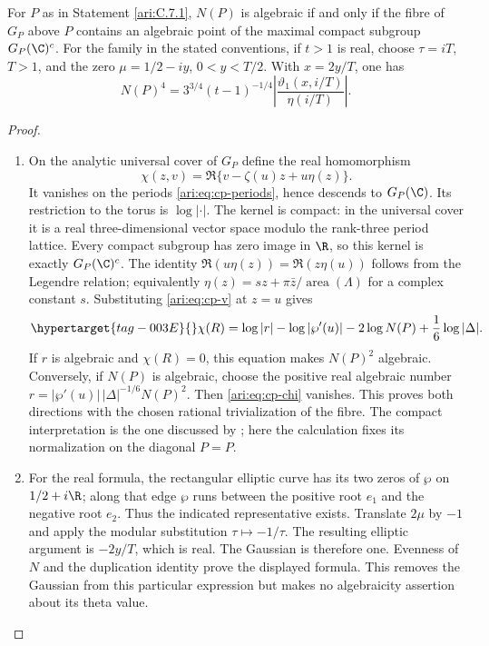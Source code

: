 \begin{proposition}\hypertarget{tag-001B}{}\label{ari:C.7.2}

For $P$ as in Statement \ref{ari:C.7.1}, $N(P)$ is algebraic if and only
if the fibre of $G_P$ above $P$ contains an algebraic point of
the maximal compact subgroup $G_P(\C)^c$.
For the family in the stated conventions, if $t>1$ is real, choose
$\tau=iT$, $T>1$, and the zero $\mu=1/2-iy$, $0<y<T/2$.
With $x=2y/T$, one has
\[
 N(P)^4=3^{3/4}(t-1)^{-1/4}
       \left|\frac{\vartheta_1(x,i/T)}{\eta(i/T)}\right|.
\]
\end{proposition}


\begin{proof}
\begin{enumerate}[label=\arabic*.,leftmargin=*]
\item On the analytic universal cover of $G_P$ define the real
homomorphism
\[
 \chi(z,v)=\Re\{v-\zeta(u)z+u\eta(z)\}.
\]
It vanishes on the periods \eqref{ari:eq:cp-periods}, hence descends
to $G_P(\C)$. Its restriction to the torus is $\log|\cdot|$.
The kernel is compact: in the universal cover it is a real
three-dimensional vector space modulo the rank-three period
lattice. Every compact subgroup has zero image in $\R$, so
this kernel is exactly $G_P(\C)^c$.
The identity
$\Re(u\eta(z))=\Re(z\eta(u))$ follows from the Legendre relation;
equivalently $\eta(z)=sz+\pi\bar z/\operatorname{area}(\Lambda)$
for a complex constant $s$. Substituting
\eqref{ari:eq:cp-v} at $z=u$ gives
\begin{equation}\hypertarget{tag-003E}{}\label{ari:eq:cp-chi}
 \chi(R)=\log|r|-\log|\wp'(u)|
            -2\log N(P)+\frac16\log|\Delta|.
\end{equation}
If $r$ is algebraic and $\chi(R)=0$, this equation makes
$N(P)^2$ algebraic. Conversely, if $N(P)$ is algebraic,
choose the positive real algebraic number
$r=|\wp'(u)|\,|\Delta|^{-1/6}N(P)^2$.
Then \eqref{ari:eq:cp-chi} vanishes. This proves both directions
with the chosen rational trivialization of the fibre.
The compact interpretation is the one discussed by
\citet[slides 5--8]{bertrand2017}; here the calculation fixes
its normalization on the diagonal $P=P$.

\item For the real formula, the rectangular elliptic curve has its
two zeros of $\wp$ on $1/2+i\R$; along that edge $\wp$ runs
between the positive root $e_1$ and the negative root $e_2$.
Thus the indicated representative exists. Translate $2\mu$
by $-1$ and apply the modular substitution $\tau\mapsto-1/\tau$.
The resulting elliptic argument is $-2y/T$, which is real.
The Gaussian is therefore one. Evenness of $N$ and the
duplication identity prove the displayed formula. This removes
the Gaussian from this particular expression but makes no
algebraicity assertion about its theta value.
\end{enumerate}
\end{proof}